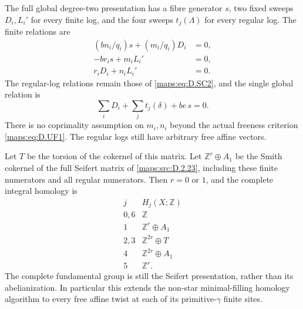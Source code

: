 \begin{theorem}
The full global degree-two presentation has a fibre generator
$s$, two fixed sweeps $D_i,L_i'$ for every finite log, and the
four sweeps $t_j(\Lambda)$ for every regular log. The finite
relations are
\[
\begin{aligned}
 (bn_i/q_i)s+(m_i/q_i)D_i&=0,\\
 -br_i s+m_iL_i'&=0,\\
 r_iD_i+n_iL_i'&=0.
\end{aligned}                                                \tag{D.UF3}\label{maps:eq:D.UF3}
\]
The regular-log relations remain those of \eqref{maps:eq:D.SC2}, and the
single global relation is
\[
 \sum_iD_i+\sum_jt_j(\delta)+be\,s=0.                       \tag{D.UF4}\label{maps:eq:D.UF4}
\]
There is no coprimality assumption on $m_i,n_i$ beyond the
actual freeness criterion \eqref{maps:eq:D.UF1}. The regular logs still have
arbitrary free affine vectors.

Let $T$ be the torsion of the cokernel of this matrix. Let
$\mathbb Z^r\oplus A_1$ be the Smith cokernel of the full
Seifert matrix of \ref{maps:src:D.2.23}, including these finite numerators
and all regular numerators. Then $r=0$ or $1$, and the complete
integral homology is
\[
\begin{array}{c|c}
 j&H_j(X;\mathbb Z)\\\hline
0,6&\mathbb Z\\
1&\mathbb Z^r\oplus A_1\\
2,3&\mathbb Z^{2r}\oplus T\\
4&\mathbb Z^{2r}\oplus A_1\\
5&\mathbb Z^r.
\end{array}                                                  \tag{D.UF5}\label{maps:eq:D.UF5}
\]
The complete fundamental group is still the Seifert
presentation, rather than its abelianization. In particular
this extends the non-star minimal-filling homology algorithm
to every free affine twist at each of its primitive-$\gamma$
finite sites.

\end{theorem}


